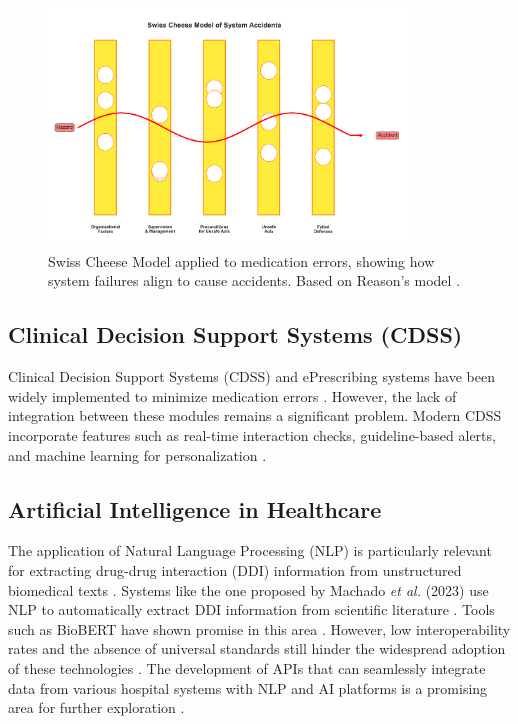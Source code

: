 \begin{figure}[htbp]
    \centering
    \includegraphics[width=0.85\textwidth]{images/generated/swiss_cheese_model.png}
    \caption{Swiss Cheese Model applied to medication errors, showing how system failures align to cause accidents. Based on Reason's model \citep{ciapponi2021, mulac2020}.}
    \label{fig:swiss_cheese}
\end{figure}

\subsection{Clinical Decision Support Systems (CDSS)}

Clinical Decision Support Systems (CDSS) \cite{moss2015, belle2013} and ePrescribing systems have been widely implemented to minimize medication errors \cite{belle2013biomedical, hawley2019}. However, the lack of integration between these modules remains a significant problem. Modern CDSS incorporate features such as real-time interaction checks, guideline-based alerts, and machine learning for personalization \cite{bates2021, zhao2021}.

\subsection{Artificial Intelligence in Healthcare}

The application of Natural Language Processing (NLP) \cite{rozenblum2020} is particularly relevant for extracting drug-drug interaction (DDI) information from unstructured biomedical texts \cite{javaid2022medical}. Systems like the one proposed by Machado \textit{et al.} (2023) use NLP to automatically extract DDI information from scientific literature \cite{machado2023drug}. Tools such as BioBERT have shown promise in this area \cite{Russell2023}. However, low interoperability rates and the absence of universal standards still hinder the widespread adoption of these technologies \citep{Chaya2023}. The development of APIs that can seamlessly integrate data from various hospital systems with NLP and AI platforms is a promising area for further exploration \cite{López2021}.

